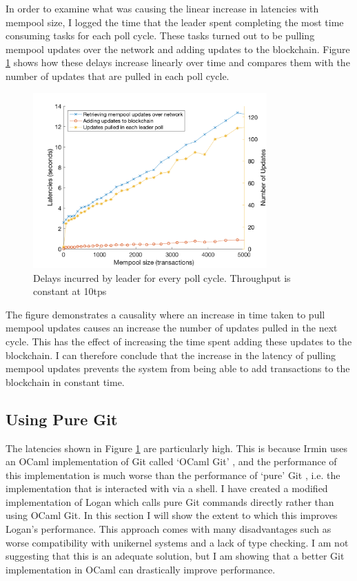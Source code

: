 \documentclass[12pt,a4paper,twoside,openright]{report}
\begin{document}
	In order to examine what was causing the linear increase in latencies with mempool size, I logged the time that the leader spent completing the most time consuming tasks for each poll cycle.
	These tasks turned out to be pulling mempool updates over the network and adding updates to the blockchain.
	Figure \ref{figs:leaderdelays} shows how these delays increase linearly over time and compares them with the number of updates that are pulled in each poll cycle.
	\begin{figure}
		\centering
		\includegraphics[width=0.8\textwidth]{figs/leader_delays_num_pulled.png}
		\caption{Delays incurred by leader for every poll cycle. Throughput is constant at 10tps}
		\label{figs:leaderdelays}
	\end{figure}
	The figure demonstrates a causality where an increase in time taken to pull mempool updates causes an increase the number of updates pulled in the next cycle. 
	This has the effect of increasing the time spent adding these updates to the blockchain.
	I can therefore conclude that the increase in the latency of pulling mempool updates prevents the system from being able to add transactions to the blockchain in constant time. \\

	\subsection{Using Pure Git}
	The latencies shown in Figure \ref{figs:leaderdelays} are particularly high. 
	This is because Irmin uses an OCaml implementation of Git called `OCaml Git' \parencite{OcamlGit}, and the performance of this implementation is much worse than the performance of `pure' Git \parencite{Git}, i.e. the implementation that is interacted with via a shell.
	I have created a modified implementation of Logan which calls pure Git commands directly rather than using OCaml Git.
	In this section I will show the extent to which this improves Logan's performance.
	This approach comes with many disadvantages such as worse compatibility with unikernel systems and a lack of type checking.
	I am not suggesting that this is an adequate solution, but I am showing that a better Git implementation in OCaml can drastically improve performance.\\ 
\end{document}
